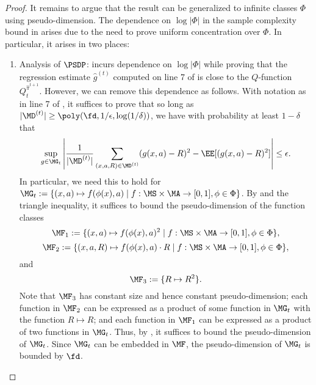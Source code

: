 \begin{proof}
It remains to argue that the result can be generalized to infinite classes $\Phi$ using pseudo-dimension. The dependence on $\log|\Phi|$ in the sample complexity bound in \cite[Theorem 3.2]{mhammedi2023efficient} arises due to the need to prove uniform concentration over $\Phi$. In particular, it arises in two places:
\begin{enumerate}
\item Analysis of $\PSDP$: \cite[Lemma D.2]{mhammedi2023efficient} incurs dependence on $\log|\Phi|$ while proving that the regression estimate $\hat g^{(t)}$ computed on line 7 of \cite[Algorithm 3]{mhammedi2023efficient} is close to the $Q$-function $Q^{\hat \pi^{t+1}}_t$. However, we can remove this dependence as follows. With notation as in line 7 of \cite[Algorithm 3]{mhammedi2023efficient}, it suffices to prove that so long as $|\MD^{(t)}| \geq \poly(\fd, 1/\epsilon,\log(1/\delta))$, we have with probability at least $1-\delta$ that
\[\sup_{g \in \MG_t} \left|\frac{1}{|\MD^{(t)}|} \sum_{(x,a,R) \in \MD^{(t)}} (g(x,a) - R)^2 - \EE[(g(x,a) - R)^2]\right| \leq \epsilon.\]
In particular, we need this to hold for $\MG_t := \{(x,a) \mapsto f(\phi(x),a) \mid{} f: \MS\times\MA \to [0,1], \phi\in\Phi\}$. By \cite[Corollary 4.3]{modi2021model} and the triangle inequality, it suffices to bound the pseudo-dimension of the function classes
\[\MF_1 := \{(x,a) \mapsto f(\phi(x),a)^2 \mid{} f: \MS\times\MA \to [0,1], \phi\in\Phi\},\]
\[\MF_2 := \{(x,a,R) \mapsto f(\phi(x),a) \cdot R \mid{} f: \MS\times\MA \to [0,1], \phi\in\Phi\},\]
and
\[\MF_3 := \{R \mapsto R^2\}.\]
Note that $\MF_3$ has constant size and hence constant pseudo-dimension; each function in $\MF_2$ can be expressed as a product of some function in $\MG_t$ with the function $R \mapsto R$; and each function in $\MF_1$ can be expressed as a product of two functions in $\MG_t$. Thus, by \cite[Lemma 50]{modi2021model}, it suffices to bound the pseudo-dimension of $\MG_t$. Since $\MG_t$ can be embedded in $\MF$, the pseudo-dimension of $\MG_t$ is bounded by $\fd$.


\end{enumerate}
\end{proof}
